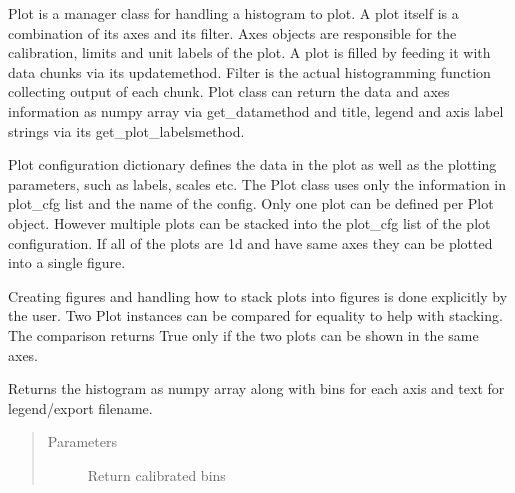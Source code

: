 \documentclass[letterpaper,10pt,english]{sphinxmanual}
\begin{document}

\begin{fulllineitems}
\label{\detokenize{autodocs/plot:listmode.plot.Plot}}
\sphinxAtStartPar
Plot is a manager class for handling a histogram to plot. A plot itself is a combination of its axes and its filter.
Axes objects are responsible for the calibration, limits and unit labels of the plot. A plot is filled by feeding
it with data chunks via its update\sphinxhyphen{}method. Filter is the actual histogramming function collecting output of each
chunk. Plot class can return the data and axes information as numpy array via get\_data\sphinxhyphen{}method and title, legend and
axis label strings via its get\_plot\_labels\sphinxhyphen{}method.

\sphinxAtStartPar
Plot configuration dictionary defines the data in the plot as well as the plotting parameters, such as labels,
scales etc. The Plot class uses only the information in plot\_cfg list and the name of the config. Only one plot can
be defined per Plot object. However multiple plots can be stacked into the plot\_cfg list of the plot configuration.
If all of the plots are 1d and have same axes they can be plotted into a single figure.

\sphinxAtStartPar
Creating figures and handling how to stack plots into figures is done explicitly by the user. Two Plot instances can
be compared for equality to help with stacking. The comparison returns True only if the two plots can be shown in
the same axes.

\begin{fulllineitems}
\label{\detokenize{autodocs/plot:listmode.plot.Plot.get_data}}
\sphinxAtStartPar
Returns the histogram as numpy array along with bins for each axis and text for legend/export filename.
\begin{quote}\begin{description}
\item[{Parameters}] \leavevmode
\sphinxAtStartPar
{} \textendash{} Return calibrated bins


\end{description}
\end{quote}
\end{fulllineitems}
\end{fulllineitems}
\end{document}
